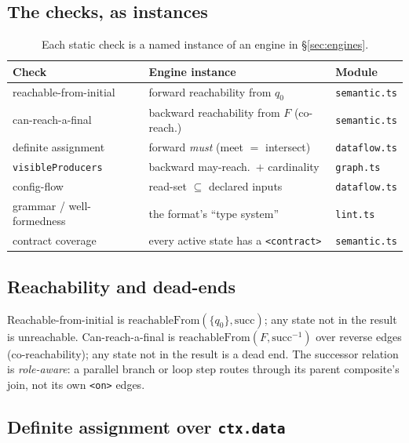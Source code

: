 \documentclass[11pt]{article}
\theoremstyle{plain}
\theoremstyle{definition}
\theoremstyle{remark}
\newcommand{\code}[1]{\texttt{#1}}
\newcommand{\state}[1]{\textsf{#1}}
\begin{document}
\subsection{The checks, as instances}

\begin{table}[h]
\centering
\small
\begin{tabular}{@{}lll@{}}
\toprule
\textbf{Check} & \textbf{Engine instance} & \textbf{Module} \\
\midrule
reachable-from-initial   & forward reachability from $q_0$           & \code{semantic.ts} \\
can-reach-a-final        & backward reachability from $F$ (co-reach.) & \code{semantic.ts} \\
definite assignment      & forward \emph{must} (meet $=$ intersect)  & \code{dataflow.ts} \\
\code{visibleProducers}  & backward may-reach.\ $+$ cardinality      & \code{graph.ts} \\
config-flow              & read-set $\subseteq$ declared inputs      & \code{dataflow.ts} \\
grammar / well-formedness& the format's ``type system''             & \code{lint.ts} \\
contract coverage        & every active state has a \code{<contract>} & \code{semantic.ts} \\
\bottomrule
\end{tabular}
\caption{Each static check is a named instance of an engine in \S\ref{sec:engines}.}
\label{tab:checks}
\end{table}

\subsection{Reachability and dead-ends}

Reachable-from-initial is $\mathrm{reachableFrom}(\{q_0\}, \mathrm{succ})$; any
state not in the result is unreachable. Can-reach-a-final is
$\mathrm{reachableFrom}(F, \mathrm{succ}^{-1})$ over reverse edges (co-reachability);
any state not in the result is a dead end. The successor relation is
\emph{role-aware}: a \state{parallel} branch or \state{loop} step routes through its
parent composite's join, not its own \code{<on>} edges.

\subsection{Definite assignment over \code{ctx.data}}\label{sec:defassign}
\end{document}
